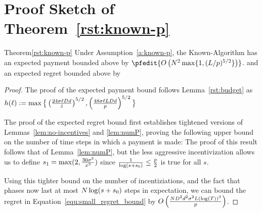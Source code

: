 \section{Proof Sketch of Theorem~\ref{rst:known-p}}
\label{sec:discussion-proof2}


\begin{rtheorem}{Theorem}{\ref{rst:known-p}}
Under Assumption~\ref{a:known-p}, the Known-\MinProb Algorithm has an expected payment bounded above by 
$\pfedit{O\left(N^2 \max\{1, (L/p)^{5/2}\}\right)}$.
and an expected regret bounded above by
\end{rtheorem}

\begin{proof}
	The proof of the expected payment bound follows Lemma~\ref{rst:budget} 
    as $h(\ell) := \max\big\{ \left(\frac{24\sigma \ell D d}{\hat{z}} \right)^{5/2},
        \left( \frac{48\sigma \ell L D d}{p} \right)^{5/2}\big\}$


The proof of the expected regret bound first establishes tightened versions of Lemmas~\ref{lem:no-incentives} and \ref{lem:numP},
proving the following upper bound on the number of time steps in which a payment is made:
The proof of this result follows that of Lemma~\ref{lem:numP},
but the less aggressive incentivization allows us to define $s_1 = \max(2, \frac{30 \sigma^3}{x^3})$ since $\frac{1}{\log(s+s_0)} \leq \frac{p}{2}$ is true for all $s$.

Using this tighter bound on the number of incentiziations, and the fact that phases now last at most $N \log(s+s_0)$ steps in expectation, we can bound the regret in Equation~\ref{equ:small_regret_bound} by
$O\left(\frac{ND^2 d^2\sigma^2 L(\log(T))^3}{p}\right)$.
\end{proof}
